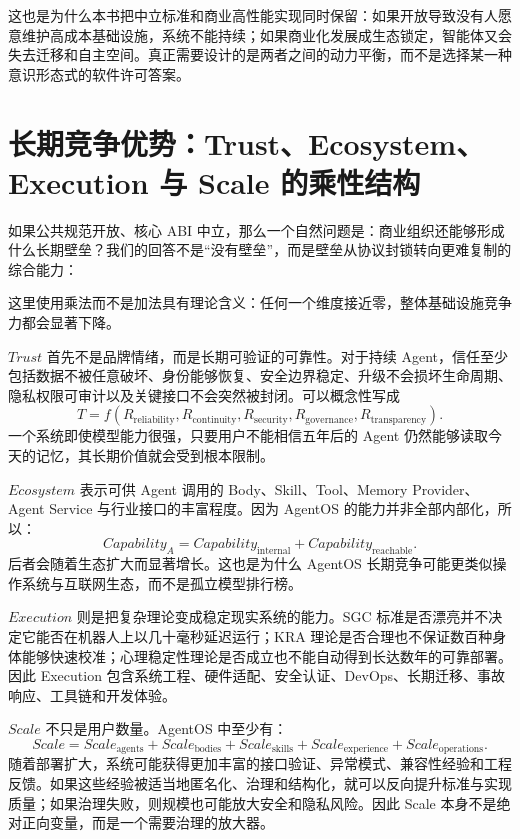 这也是为什么本书把中立标准和商业高性能实现同时保留：如果开放导致没有人愿意维护高成本基础设施，系统不能持续；如果商业化发展成生态锁定，智能体又会失去迁移和自主空间。真正需要设计的是两者之间的动力平衡，而不是选择某一种意识形态式的软件许可答案。

\section{长期竞争优势：Trust、Ecosystem、Execution 与 Scale 的乘性结构}

如果公共规范开放、核心 ABI 中立，那么一个自然问题是：商业组织还能够形成什么长期壁垒？我们的回答不是``没有壁垒''，而是壁垒从协议封锁转向更难复制的综合能力：
\begin{statementbox}
\centering
{}
\end{statementbox}
这里使用乘法而不是加法具有理论含义：任何一个维度接近零，整体基础设施竞争力都会显著下降。

$Trust$ 首先不是品牌情绪，而是长期可验证的可靠性。对于持续 Agent，信任至少包括数据不被任意破坏、身份能够恢复、安全边界稳定、升级不会损坏生命周期、隐私权限可审计以及关键接口不会突然被封闭。可以概念性写成
\[
T
=
f(
R_{\mathrm{reliability}},
R_{\mathrm{continuity}},
R_{\mathrm{security}},
R_{\mathrm{governance}},
R_{\mathrm{transparency}}
).
\]
一个系统即使模型能力很强，只要用户不能相信五年后的 Agent 仍然能够读取今天的记忆，其长期价值就会受到根本限制。

$Ecosystem$ 表示可供 Agent 调用的 Body、Skill、Tool、Memory Provider、Agent Service 与行业接口的丰富程度。因为 AgentOS 的能力并非全部内部化，所以：
\[
Capability_A
=
Capability_{\mathrm{internal}}
+
Capability_{\mathrm{reachable}}.
\]
后者会随着生态扩大而显著增长。这也是为什么 AgentOS 长期竞争可能更类似操作系统与互联网生态，而不是孤立模型排行榜。

$Execution$ 则是把复杂理论变成稳定现实系统的能力。SGC 标准是否漂亮并不决定它能否在机器人上以几十毫秒延迟运行；KRA 理论是否合理也不保证数百种身体能够快速校准；心理稳定性理论是否成立也不能自动得到长达数年的可靠部署。因此 Execution 包含系统工程、硬件适配、安全认证、DevOps、长期迁移、事故响应、工具链和开发体验。

$Scale$ 不只是用户数量。AgentOS 中至少有：
\[
Scale=
Scale_{\mathrm{agents}}
+
Scale_{\mathrm{bodies}}
+
Scale_{\mathrm{skills}}
+
Scale_{\mathrm{experience}}
+
Scale_{\mathrm{operations}}.
\]
随着部署扩大，系统可能获得更加丰富的接口验证、异常模式、兼容性经验和工程反馈。如果这些经验被适当地匿名化、治理和结构化，就可以反向提升标准与实现质量；如果治理失败，则规模也可能放大安全和隐私风险。因此 Scale 本身不是绝对正向变量，而是一个需要治理的放大器。

